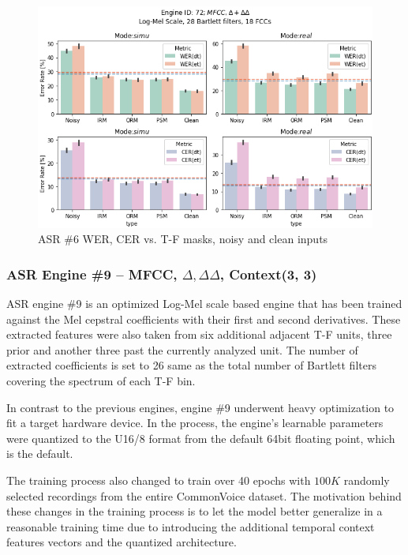 \begin{figure}[H]
    \centering
    \includegraphics[width=0.95\linewidth]{ASR/images/asr72_wer_masks.png}
    \caption{ASR \#6 WER, CER vs. T-F masks, noisy and clean inputs }\label{fig:asr72_wer_masks}
\end{figure}

\subsubsection{ASR Engine \#9 -- MFCC, \(\Delta,\Delta\Delta\), Context(3, 3)}
ASR engine \#9 is an optimized Log-Mel scale based engine
that has been trained against the Mel cepstral coefficients
with their first and second derivatives. These extracted features
were also taken from six additional adjacent T-F units, three
prior and another three past the currently analyzed unit.
The number of extracted coefficients is set to 26 same as the
total number of Bartlett filters covering the spectrum of each T-F bin.

\bigskip

In contrast to the previous engines, engine \#9
underwent heavy optimization to fit a target hardware device.
In the process, the engine's learnable parameters were quantized
to the U16/8 format from the default 64bit floating point, which is the default.

\bigskip

The training process also changed to train over 40 epochs
with \(100K\) randomly selected recordings from the
entire CommonVoice dataset. The motivation behind
these changes in the training process is to let the model
better generalize in a reasonable training time due to
introducing the additional temporal context 
features vectors and the quantized architecture.

